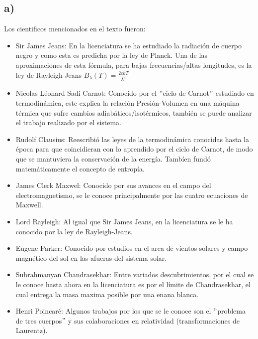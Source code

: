 \documentclass[2pt]{article}
\begin{document}
\subsection*{a)}
Los cientificos mencionados en el texto fueron:
\begin{itemize}
\item Sir James Jeans: En la licenciatura se ha estudiado la radiación de cuerpo negro y como esta es predicha por la ley de Planck. Una de las aproximaciones de esta fórmula, para bajas frecuencias/altas longitudes, es la ley de Rayleigh-Jeans $B_\lambda(T)=\frac{2ckT}{\lambda^4}$

\item Nicolas Léonard Sadi Carnot: Conocido por el $"$ciclo de Carnot$"$ estudiado en termodinámica, este explica la relación Presión-Volumen en una máquina térmica que sufre cambios adiabáticos/isotérmicos, también se puede analizar el trabajo realizado por el sistema.

\item Rudolf Clausius: Reescribió las leyes de la termodinámica conocidas hasta la época para que coincidieran con lo aprendido por el ciclo de Carnot, de modo que se mantuviera la conservación de la energía. Tambíen fundó matemáticamente el concepto de entropía.

\item James Clerk Maxwel: Conocido por sus avances en el campo del electromagnetismo, se le conoce principalmente por las cuatro ecuaciones de Maxwell.

\item Lord Rayleigh: Al igual que Sir James Jeans, en la licenciatura se le ha conocido por la ley de Rayleigh-Jeans.

\item Eugene Parker: Conocido por estudios en el area de vientos solares y campo magnético del sol en las afueras del sistema solar.

\item Subrahmanyan Chandrasekhar: Entre variados descubrimientos, por el cual se le conoce hasta ahora en la licenciatura es por el límite de  Chandrasekhar, el cual entrega la masa maxima posible por una enana blanca.

\item Henri Poincaré: Algunos trabajos por los que se le conoce son el $"$problema de tres cuerpos$"$ y sus colaboraciones en relatividad (transformaciones de Laurentz).

\end{itemize}
\end{document}

